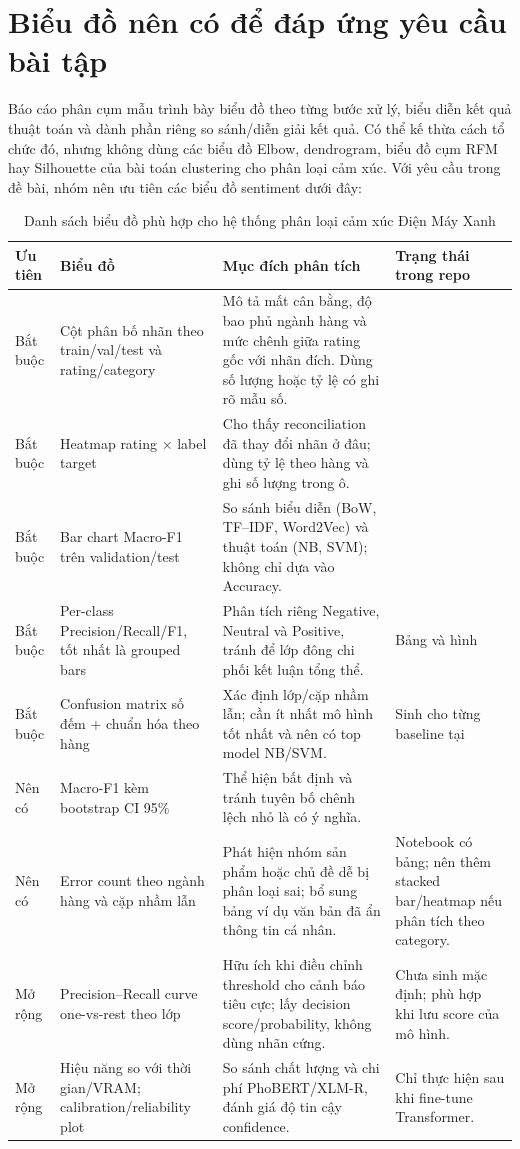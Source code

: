 \section{Biểu đồ nên có để đáp ứng yêu cầu bài tập}
Báo cáo phân cụm mẫu trình bày biểu đồ theo từng bước xử lý, biểu diễn kết quả thuật toán và dành phần riêng so sánh/diễn giải kết quả. Có thể kế thừa cách tổ chức đó, nhưng không dùng các biểu đồ Elbow, dendrogram, biểu đồ cụm RFM hay Silhouette của bài toán clustering cho phân loại cảm xúc. Với yêu cầu trong đề bài, nhóm nên ưu tiên các biểu đồ sentiment dưới đây:

\begin{table}[H]
\centering
\caption{Danh sách biểu đồ phù hợp cho hệ thống phân loại cảm xúc Điện Máy Xanh}
\label{tab:recommended-charts}
\small
\begin{tabularx}{\textwidth}{p{0.6cm}p{3.5cm}Yp{3.0cm}}
\toprule
Ưu tiên & Biểu đồ & Mục đích phân tích & Trạng thái trong repo \\
\midrule
Bắt buộc & Cột phân bố nhãn theo train/val/test và rating/category & Mô tả mất cân bằng, độ bao phủ ngành hàng và mức chênh giữa rating gốc với nhãn đích. Dùng số lượng hoặc tỷ lệ có ghi rõ mẫu số. &  \\
Bắt buộc & Heatmap rating $\times$ label target & Cho thấy reconciliation đã thay đổi nhãn ở đâu; dùng tỷ lệ theo hàng và ghi số lượng trong ô. &  \\
Bắt buộc & Bar chart Macro-F1 trên validation/test & So sánh biểu diễn (BoW, TF--IDF, Word2Vec) và thuật toán (NB, SVM); không chỉ dựa vào Accuracy. &  \\
Bắt buộc & Per-class Precision/Recall/F1, tốt nhất là grouped bars & Phân tích riêng Negative, Neutral và Positive, tránh để lớp đông chi phối kết luận tổng thể. & Bảng và hình  \\
Bắt buộc & Confusion matrix số đếm + chuẩn hóa theo hàng & Xác định lớp/cặp nhầm lẫn; cần ít nhất mô hình tốt nhất và nên có top model NB/SVM. & Sinh cho từng baseline tại  \\
Nên có & Macro-F1 kèm bootstrap CI 95\% & Thể hiện bất định và tránh tuyên bố chênh lệch nhỏ là có ý nghĩa. &  \\
Nên có & Error count theo ngành hàng và cặp nhầm lẫn & Phát hiện nhóm sản phẩm hoặc chủ đề dễ bị phân loại sai; bổ sung bảng ví dụ văn bản đã ẩn thông tin cá nhân. & Notebook có bảng; nên thêm stacked bar/heatmap nếu phân tích theo category. \\
Mở rộng & Precision--Recall curve one-vs-rest theo lớp & Hữu ích khi điều chỉnh threshold cho cảnh báo tiêu cực; lấy decision score/probability, không dùng nhãn cứng. & Chưa sinh mặc định; phù hợp khi lưu score của mô hình. \\
Mở rộng & Hiệu năng so với thời gian/VRAM; calibration/reliability plot & So sánh chất lượng và chi phí PhoBERT/XLM-R, đánh giá độ tin cậy confidence. & Chỉ thực hiện sau khi fine-tune Transformer. \\
\bottomrule
\end{tabularx}
\end{table}

